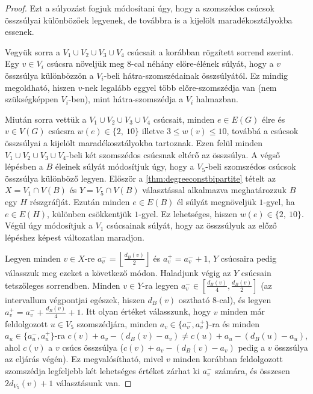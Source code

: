 \documentclass[12pt, a4paper]{report}
\theoremstyle{remark}
\theoremstyle{definition}
\begin{document}
\begin{proof}
Ezt a súlyozást fogjuk módosítani úgy, hogy a szomszédos csúcsok összsúlyai különbözőek legyenek, de továbbra is a kijelölt maradékosztályokba essenek.

Vegyük sorra a $V_1 \cup V_2 \cup V_3 \cup V_4$ csúcsait a korábban rögzített sorrend szerint. Egy $v \in V_i$ csúcsra növeljük meg $8$-cal néhány előre-élének súlyát, hogy a $v$ összsúlya különbözzön a $V_i$-beli hátra-szomszédainak összsúlyától. Ez mindig megoldható, hiszen $v$-nek legalább eggyel több előre-szomszédja van (nem szükségképpen $V_i$-ben), mint hátra-szomszédja a $V_i$ halmazban.

Miután sorra vettük a $V_1 \cup V_2 \cup V_3 \cup V_4$ csúcsait, minden $e \in E(G)$ élre és $v \in V(G)$ csúcsra $w(e) \in \lbrace 2,\ 10 \rbrace$ illetve $3 \leq w(v) \leq 10$, továbbá a csúcsok összsúlyai a kijelölt maradékosztályokba tartoznak. Ezen felül minden $V_1 \cup V_2 \cup V_3 \cup V_4$-beli két szomszédos csúcsnak eltérő az összsúlya. A végső lépésben a $B$ éleinek súlyát módosítjuk úgy, hogy a $V_5$-beli szomszédos csúcsok összsúlya különböző legyen. Először a \ref{thm:degreeconstbipartite} tételt az $X = V_1 \cap V(B)$ és $Y = V_5 \cap V(B)$ választással alkalmazva meghatározzuk $B$ egy $H$ részgráfját. Ezután minden $e \in E(B)$ él súlyát megnöveljük $1$-gyel, ha $e \in E(H)$, különben csökkentjük $1$-gyel. Ez lehetséges, hiszen $w(e) \in \lbrace 2,\ 10 \rbrace$. Végül úgy módosítjuk a $V_1$ csúcsainak súlyát, hogy az összsúlyuk az előző lépéshez képest változatlan maradjon.

Legyen minden $v \in X$-re $a_v^- = \left\lfloor \frac{d_B(v)}{2} \right\rfloor$ és $a_v^+ = a_v^- + 1$, $Y$ csúcsaira pedig válasszuk meg ezeket a következő módon. Haladjunk végig az $Y$ csúcsain tetszőleges sorrendben. Minden $v \in Y$-ra legyen $a_v^- \in \left\lbrack \frac{d_B(v)}{4}, \frac{d_B(v)}{2} \right\rbrack$ (az intervallum végpontjai egészek, hiszen $d_B(v)$ osztható $8$-cal), és legyen $a_v^+ = a_v^- + \frac{d_B(v)}{4} + 1$. Itt olyan értéket válasszunk, hogy $v$ minden már feldolgozott $u \in V_5$ szomszédjára, minden $a_v \in \lbrace a_v^-, a_v^+ \rbrace$-ra és minden $a_u \in \lbrace a_u^-, a_u^+ \rbrace$-ra $c(v) + a_v - (d_B(v) - a_v) \neq c(u) + a_u - (d_B(u) - a_u)$, ahol $c(v)$ a $v$ csúcs összsúlya ($c(v) + a_v - (d_B(v) - a_v)$ pedig a $v$ összsúlya az eljárás végén). Ez megvalósítható, mivel $v$ minden korábban feldolgozott szomszédja legfeljebb két lehetséges értéket zárhat ki $a_v^-$ számára, és összesen $2d_{V_5}(v) + 1$ választásunk van.


\end{proof}
\end{document}
